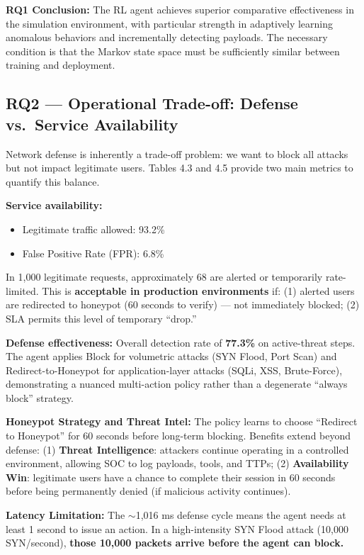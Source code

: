 \documentclass[12pt,a4paper]{report}
\begin{document}
\textbf{RQ1 Conclusion:} The RL agent achieves superior comparative effectiveness in the simulation environment, with particular strength in adaptively learning anomalous behaviors and incrementally detecting payloads. The necessary condition is that the Markov state space must be sufficiently similar between training and deployment.

\subsection{RQ2 --- Operational Trade-off: Defense vs.\ Service Availability}

Network defense is inherently a trade-off problem: we want to block all attacks but not impact legitimate users. Tables 4.3 and 4.5 provide two main metrics to quantify this balance.

\textbf{Service availability:}
\begin{itemize}
  \item Legitimate traffic allowed: 93.2\%
  \item False Positive Rate (FPR): 6.8\%
\end{itemize}

In 1,000 legitimate requests, approximately 68 are alerted or temporarily rate-limited. This is \textbf{acceptable in production environments} if: (1) alerted users are redirected to honeypot (60 seconds to verify) --- not immediately blocked; (2) SLA permits this level of temporary ``drop.''

\textbf{Defense effectiveness:} Overall detection rate of \textbf{77.3\%} on active-threat steps. The agent applies Block for volumetric attacks (SYN Flood, Port Scan) and Redirect-to-Honeypot for application-layer attacks (SQLi, XSS, Brute-Force), demonstrating a nuanced multi-action policy rather than a degenerate ``always block'' strategy.

\textbf{Honeypot Strategy and Threat Intel:} The policy learns to choose ``Redirect to Honeypot'' for 60 seconds before long-term blocking. Benefits extend beyond defense: (1) \textbf{Threat Intelligence}: attackers continue operating in a controlled environment, allowing SOC to log payloads, tools, and TTPs; (2) \textbf{Availability Win}: legitimate users have a chance to complete their session in 60 seconds before being permanently denied (if malicious activity continues).

\textbf{Latency Limitation:} The $\sim$1,016 ms defense cycle means the agent needs at least 1 second to issue an action. In a high-intensity SYN Flood attack (10,000 SYN/second), \textbf{those 10,000 packets arrive before the agent can block.}
\end{document}

